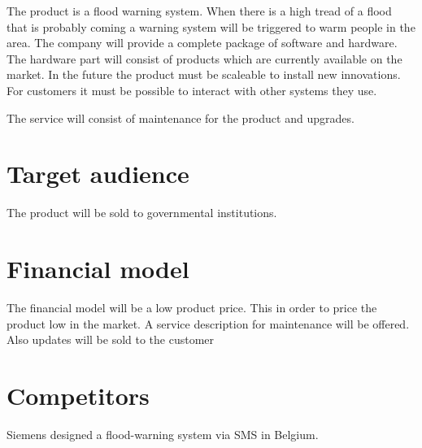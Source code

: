 The product is a flood warning system. When there is a high tread of a flood that is probably coming a warning system will be triggered to warm people in the area. The company will provide a complete package of software and hardware. The hardware part will consist of products which are currently available on the market. In the future the product must be scaleable to install new innovations. For customers it must be possible to interact with other systems they use.

The service will consist of maintenance for the product and upgrades.

\section{Target audience}
The product will be sold to governmental institutions. 

\section{Financial model}
The financial model will be a low product price. This in order to price the product low in the market. A service description for maintenance will be offered. Also updates will be sold to the customer

\section{Competitors}
Siemens designed a flood-warning system via SMS in Belgium.




